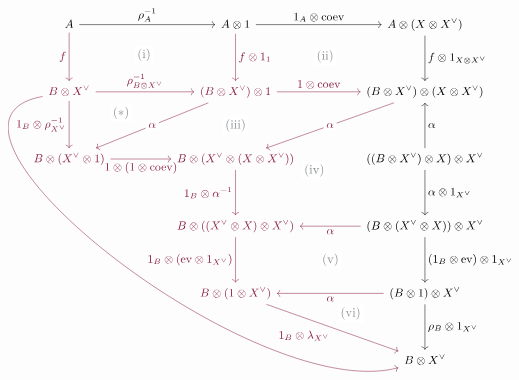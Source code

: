 \[
\begin{tikzcd}[
    sep=huge,
    cells={nodes={font=\small}},
    every label/.append style={font=\small}
]
    A
        \arrow[r,"\rho_A^{-1}"]
        \arrow[d,rojoDiagramaCIMAT,"f"']
    & A\otimes1
        \arrow[r,"1_A\otimes\mathrm{coev}"]
        \arrow[d,rojoDiagramaCIMAT,"f\otimes1_1"]
    & A\otimes(X\otimes X^\vee)
        \arrow[d,"f\otimes1_{X\otimes X^\vee}"]
    \\
    |[text=rojoDiagramaCIMAT]| B\otimes X^\vee
        \arrow[r,rojoDiagramaCIMAT,"\rho_{B\otimes X^\vee}^{-1}"]
        \arrow[d,rojoDiagramaCIMAT,"1_B\otimes\rho_{X^\vee}^{-1}"']
    & |[text=rojoDiagramaCIMAT]| (B\otimes X^\vee)\otimes1
        \arrow[r,rojoDiagramaCIMAT,"1\otimes\mathrm{coev}"]
        \arrow[dl,rojoDiagramaCIMAT,"\alpha" description]
    & (B\otimes X^\vee)\otimes(X\otimes X^\vee)
        \arrow[dl,rojoDiagramaCIMAT,"\alpha" description]
    \\
    |[text=rojoDiagramaCIMAT]| B\otimes(X^\vee\otimes1)
        \arrow[r,rojoDiagramaCIMAT,"1\otimes(1\otimes\mathrm{coev})"']
    & |[text=rojoDiagramaCIMAT]| B\otimes(X^\vee\otimes(X\otimes X^\vee))
        \arrow[d,rojoDiagramaCIMAT,"1_B\otimes\alpha^{-1}"']
    & ((B\otimes X^\vee)\otimes X)\otimes X^\vee
        \arrow[u,"\alpha"']
        \arrow[d,"\alpha\otimes1_{X^\vee}"]
    \\
    & |[text=rojoDiagramaCIMAT]| B\otimes((X^\vee\otimes X)\otimes X^\vee)
        \arrow[d,rojoDiagramaCIMAT,"1_B\otimes(\mathrm{ev}\otimes1_{X^\vee})"']
    & (B\otimes(X^\vee\otimes X))\otimes X^\vee
        \arrow[l,rojoDiagramaCIMAT,"\alpha"]
        \arrow[d,"(1_B\otimes\mathrm{ev})\otimes1_{X^\vee}"]
    \\
    & |[text=rojoDiagramaCIMAT]| B\otimes(1\otimes X^\vee)
        \arrow[dr,rojoDiagramaCIMAT,"1_B\otimes\lambda_{X^\vee}"']
    & (B\otimes1)\otimes X^\vee
        \arrow[l,rojoDiagramaCIMAT,"\alpha"]
        \arrow[d,"\rho_B\otimes1_{X^\vee}"]
    \\
    && B\otimes X^\vee
    \arrow[phantom,from=1-1,to=2-2,"\color{grisCIMAT}\mathrm{(i)}" description]
    \arrow[phantom,from=1-2,to=2-3,"\color{grisCIMAT}\mathrm{(ii)}" description]
    \arrow[phantom,from=2-1,to=3-2,"\color{grisCIMAT}(\ast)"{description,pos=.25}]
    \arrow[phantom,from=2-2,to=3-2,"\mathrm{\color{grisCIMAT}(iii)}" description]
    \arrow[phantom,from=2-3,to=4-2,"\mathrm{\color{grisCIMAT}(iv)}"{description,pos=.6}]
    \arrow[phantom,from=4-2,to=5-3,"\mathrm{\color{grisCIMAT}(v)}" description]
    \arrow[phantom,from=5-2,to=6-3,"\mathrm{\color{grisCIMAT}(vi)}"{description,yshift=4mm,xshift=5mm}]
    \arrow[from=2-1,to=6-3,rojoDiagramaCIMAT,out=190,in=195,looseness=0.85, overlay]
\end{tikzcd}
\]